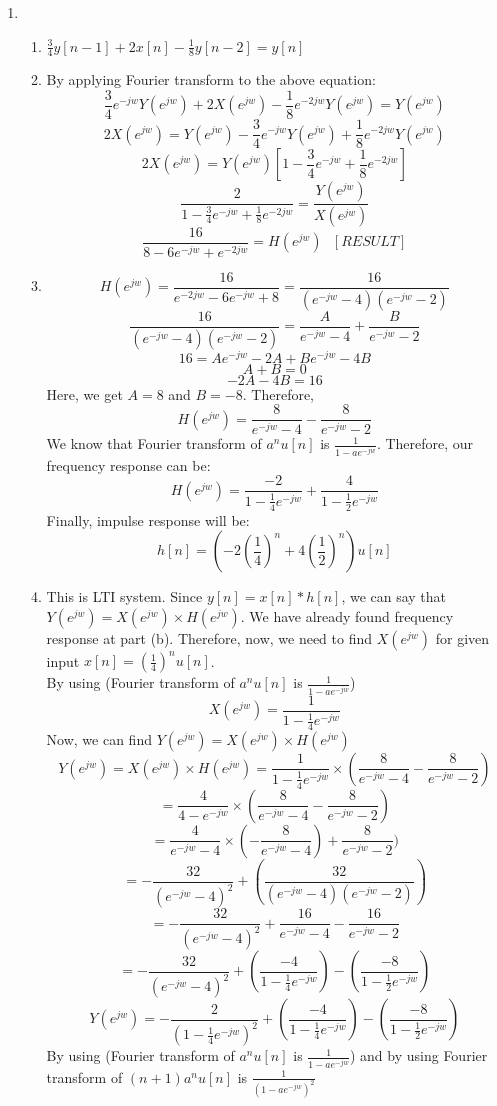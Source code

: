 \documentclass[10pt,a4paper, margin=1in]{article}
\begin{document}
\begin{enumerate}
\item %
    \begin{enumerate}
    \item %
    $\frac{3}{4}y[n-1] + 2x[n] - \frac{1}{8}y[n-2] = y[n]$
    \item %
    By applying Fourier transform to the above equation:
	\[ \frac{3}{4}e^{-jw}Y(e^{jw}) + 2X(e^{jw}) - \frac{1}{8}e^{-2jw}Y(e^{jw}) = Y(e^{jw}) \]
	\[ 2X(e^{jw}) = Y(e^{jw}) -\frac{3}{4}e^{-jw}Y(e^{jw}) + \frac{1}{8}e^{-2jw}Y(e^{jw}) \]
	\[ 2X(e^{jw}) = Y(e^{jw})[1 -\frac{3}{4}e^{-jw} + \frac{1}{8}e^{-2jw}] \]
	\[ \frac{2}{1 -\frac{3}{4}e^{-jw} + \frac{1}{8}e^{-2jw}} = \frac{Y(e^{jw})}{X(e^{jw})}\]
	\[ \frac{16}{8 - 6e^{-jw} + e^{-2jw}} = H(e^{jw}) \ \ \ [RESULT] \]   
    \item %
    \[ H(e^{jw}) = \frac{16}{e^{-2jw} -6e^{-jw} + 8} = \frac{16}{(e^{-jw} -4)(e^{-jw}-2)} \]
    \[ \frac{16}{(e^{-jw} -4)(e^{-jw}-2)} = \frac{A}{e^{-jw} -4} + \frac{B}{e^{-jw}-2} \]
    \[ 16 = Ae^{-jw} - 2A + Be^{-jw} -4B \]
    \[ A+B = 0 \]
    \[ -2A-4B = 16 \]
    Here, we get $A = 8$ and $B = -8$. Therefore,
    \[ H(e^{jw}) = \frac{8}{e^{-jw} -4} - \frac{8}{e^{-jw}-2} \]
    We know that Fourier transform of $a^nu[n]$ is $\frac{1}{1-ae^{-jw}}$. Therefore, our frequency response can be:
    \[ H(e^{jw}) = \frac{-2}{1 - \frac{1}{4}e^{-jw}} + \frac{4}{1-\frac{1}{2}e^{-jw}}  \]
    Finally, impulse response will be:
    \[ h[n] = \left(-2(\frac{1}{4})^n + 4(\frac{1}{2})^n\right)u[n] \]
    \item %
    This is LTI system. Since $y[n] = x[n] * h[n]$, we can say that $Y(e^{jw}) = X(e^{jw}) \times H(e^{jw})$. We have already found frequency response at part (b). Therefore, now, we need to find $X(e^{jw})$ for given input $x[n] = (\frac{1}{4})^nu[n]$. \\ 
    By using (Fourier transform of $a^nu[n]$ is $\frac{1}{1-ae^{-jw}}$)
    \[ X(e^{jw}) = \frac{1}{1- \frac{1}{4}e^{-jw}} \]
    Now, we can find $Y(e^{jw}) = X(e^{jw}) \times H(e^{jw})$
    \[ Y(e^{jw}) = X(e^{jw}) \times H(e^{jw}) = \frac{1}{1- \frac{1}{4}e^{-jw}} \times (\frac{8}{e^{-jw} -4} - \frac{8}{e^{-jw}-2}) \]
    \[ = \frac{4}{4 - e^{-jw}} \times (\frac{8}{e^{-jw} -4} - \frac{8}{e^{-jw}-2}) \]
    \[ = \frac{4}{e^{-jw} -4} \times (- \frac{8}{e^{-jw} -4}) + \frac{8}{e^{-jw}-2}) \]
    \[ = - \frac{32}{(e^{-jw} -4)^2} + (\frac{32}{(e^{-jw} -4)(e^{-jw} -2)}) \]
    \[ = - \frac{32}{(e^{-jw} -4)^2} + \frac{16}{e^{-jw} -4} - \frac{16}{e^{-jw} -2} \]
    \[ = - \frac{32}{(e^{-jw} -4)^2} + (\frac{-4}{1-\frac{1}{4}e^{-jw}}) - (\frac{-8}{1-\frac{1}{2}e^{-jw}}) \]
    \[ Y(e^{jw}) = - \frac{2}{(1-\frac{1}{4}e^{-jw})^2} + (\frac{-4}{1-\frac{1}{4}e^{-jw}}) - (\frac{-8}{1-\frac{1}{2}e^{-jw}})  \]
     By using (Fourier transform of $a^nu[n]$ is $\frac{1}{1-ae^{-jw}}$) and by using Fourier transform of $(n+1)a^nu[n]$ is $\frac{1}{(1-ae^{-jw})^2}$ \\
   

\end{enumerate}
\end{enumerate}
\end{document}
